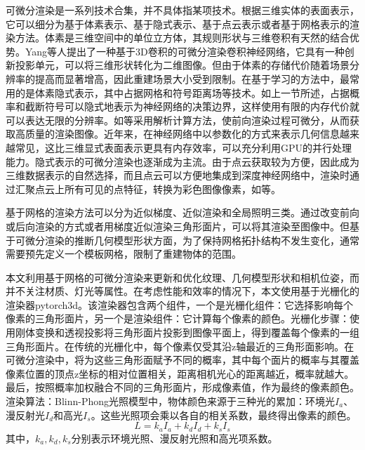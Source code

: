 可微分渲染是一系列技术合集，并不具体指某项技术。根据三维实体的表面表示，它可以细分为基于体素表示、基于隐式表示、基于点云表示或者基于网格表示的渲染方法。体素是三维空间中的单位立方体，其规则形状与三维卷积有天然的结合优势。Yang等人提出了一种基于3D卷积的可微分渲染卷积神经网络，它具有一种创新投影单元，可以将三维形状转化为二维图像。但由于体素的存储代价随着场景分辨率的提高而显著增高，因此重建场景大小受到限制。在基于学习的方法中，最常用的是体素隐式表示，其中占据网格和符号距离场等技术。如上一节所述，占据概率和截断符号可以隐式地表示为神经网络的决策边界，这样使用有限的内存代价就可以表达无限的分辨率。如等采用解析计算方法，使前向渲染过程可微分，从而获取高质量的渲染图像。近年来，在神经网络中以参数化的方式来表示几何信息越来越常见，这比三维显式表面表示更具有内存效率，可以充分利用GPU的并行处理能力。隐式表示的可微分渲染也逐渐成为主流。由于点云获取较为方便，因此成为三维数据表示的自然选择，而且点云可以方便地集成到深度神经网络中，渲染时通过汇聚点云上所有可见的点特征，转换为彩色图像像素，如等。

基于网格的渲染方法可以分为近似梯度、近似渲染和全局照明三类。通过改变前向或后向渲染的方式或者用梯度近似渲染三角形面片，可以将其渲染至图像中。但基于可微分渲染的推断几何模型形状方面，为了保持网格拓扑结构不发生变化，通常需要预先定义一个模板网格，限制了重建物体的范围。\par

本文利用基于网格的可微分渲染来更新和优化纹理、几何模型形状和相机位姿，而并不关注材质、灯光等属性。在考虑性能和效率的情况下，本文使用基于光栅化的渲染器pytorch3d。该渲染器包含两个组件，一个是光栅化组件：它选择影响每个像素的三角形面片，另一个是渲染组件：它计算每个像素的颜色。光栅化步骤：使用刚体变换和透视投影将三角形面片投影到图像平面上，得到覆盖每个像素的一组三角形面片。在传统的光栅化中，每个像素仅受其沿z轴最近的三角形面影响。在可微分渲染中，将为这些三角形面赋予不同的概率，其中每个面片的概率与其覆盖像素位置的顶点z坐标的相对位置相关，距离相机光心的距离越近，概率就越大。最后，按照概率加权融合不同的三角形面片，形成像素值，作为最终的像素颜色。渲染算法：Blinn-Phong光照模型中，物体颜色来源于三种光的累加：环境光$I_a$、漫反射光$I_d$和高光$I_s$。这些光照项会乘以各自的相关系数，最终得出像素的颜色。
\begin{equation}
    L = k_aI_a + k_dI_d+k_sI_s
\end{equation}
其中，$k_a,k_d,k_s$分别表示环境光照、漫反射光照和高光项系数。


